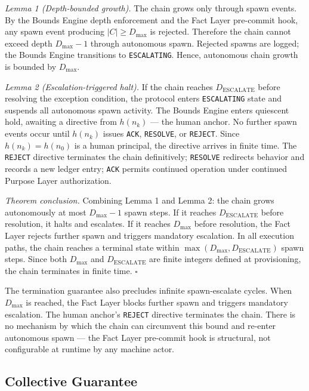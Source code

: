 \medskip
\textit{Lemma 1 (Depth-bounded growth).} The chain grows only through spawn events. By the Bounds Engine depth enforcement and the Fact Layer pre-commit hook, any spawn event producing $|C| \geq D_{\mathrm{max}}$ is rejected. Therefore the chain cannot exceed depth $D_{\mathrm{max}} - 1$ through autonomous spawn. Rejected spawns are logged; the Bounds Engine transitions to \texttt{ESCALATING}. Hence, autonomous chain growth is bounded by $D_{\mathrm{max}}$.

\medskip
\textit{Lemma 2 (Escalation-triggered halt).} If the chain reaches $D_{\mathrm{ESCALATE}}$ before resolving the exception condition, the protocol enters \texttt{ESCALATING} state and suspends all autonomous spawn activity. The Bounds Engine enters quiescent hold, awaiting a directive from $h(n_k)$ — the human anchor. No further spawn events occur until $h(n_k)$ issues \texttt{ACK}, \texttt{RESOLVE}, or \texttt{REJECT}. Since $h(n_k) = h(n_0)$ is a human principal, the directive arrives in finite time. The \texttt{REJECT} directive terminates the chain definitively; \texttt{RESOLVE} redirects behavior and records a new ledger entry; \texttt{ACK} permits continued operation under continued Purpose Layer authorization.

\medskip
\textit{Theorem conclusion.} Combining Lemma 1 and Lemma 2: the chain grows autonomously at most $D_{\mathrm{max}} - 1$ spawn steps. If it reaches $D_{\mathrm{ESCALATE}}$ before resolution, it halts and escalates. If it reaches $D_{\mathrm{max}}$ before resolution, the Fact Layer rejects further spawn and triggers mandatory escalation. In all execution paths, the chain reaches a terminal state within $\max(D_{\mathrm{max}}, D_{\mathrm{ESCALATE}})$ spawn steps. Since both $D_{\mathrm{max}}$ and $D_{\mathrm{ESCALATE}}$ are finite integers defined at provisioning, the chain terminates in finite time. $\square$

The termination guarantee also precludes infinite spawn-escalate cycles. When $D_{\mathrm{max}}$ is reached, the Fact Layer blocks further spawn and triggers mandatory escalation. The human anchor's \texttt{REJECT} directive terminates the chain. There is no mechanism by which the chain can circumvent this bound and re-enter autonomous spawn — the Fact Layer pre-commit hook is structural, not configurable at runtime by any machine actor.

\subsection{Collective Guarantee}
\label{sec:rs-collective-guarantee}

